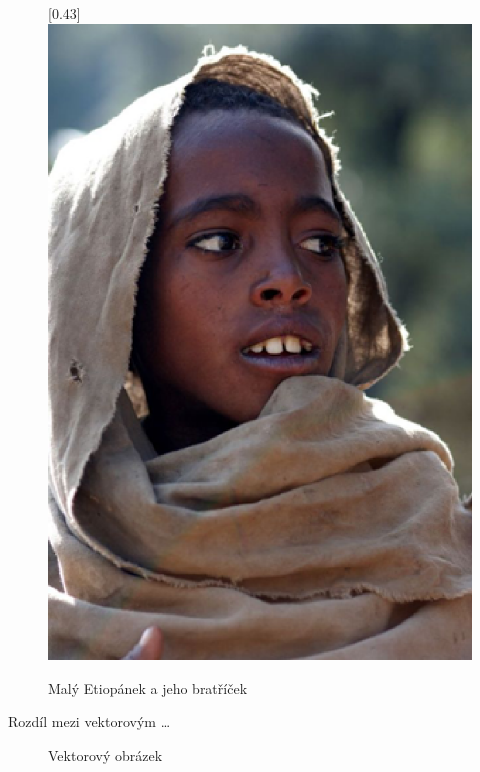 \documentclass[11pt,a4paper]{article}
\begin{document}
\begin{figure}[h]
  \scalebox{-0.43}[0.43]{\includegraphics{etiopan.eps}}
  \caption{Malý Etiopánek a jeho bratříček}
  \label{ob_1}
\end{figure}

\vspace{0.25cm}

\pagebreak

\hspace{-0.5cm} Rozdíl mezi vektorovým \dots

\begin{figure}[h]
  \centering
  \caption{Vektorový obrázek}
  \label{ob_2}
\end{figure}
\end{document}
